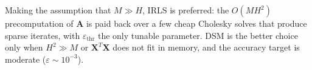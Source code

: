 Making the assumption that $M \gg H$, IRLS is preferred: the $O(MH^2)$ precomputation of $\mathbf{A}$ is paid back over a few cheap Cholesky solves that produce sparse iterates, with $\varepsilon_{\mathrm{thr}}$ the only tunable parameter. DSM is the better choice only when $H^2 \gg M$ or $\mathbf{X}^T\mathbf{X}$ does not fit in memory, and the accuracy target is moderate ($\varepsilon \sim 10^{-3}$).
